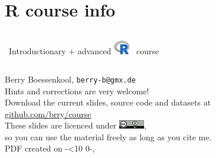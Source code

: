 \documentclass[xcolor=table,       handout,    xcolor=dvipsnames]{beamer}\usepackage[]{graphicx}\usepackage[]{color}
\newcommand{\leadingzero}[1]{\ifnum #1<10 0\the#1\else\the#1\fi}
\begin{document}






\section{R course info}



{
\begin{frame}
\begin{center}
    \begin{columns}
    \column{22.0em}
    \begin{block}{}{\Large ~Introductionary + advanced \includegraphics[width=0.7cm]{externalfig/Rlogo.png} ~course}
    \end{block}
    \end{columns}
\vspace{1em}
Berry Boessenkool, \texttt{berry-b@gmx.de}\\
Hints and corrections are very welcome!\\[1em]
Download the current slides, source code and datasets at\\
\Large
\href{https://github.com/brry/course}{github.com/brry/course}\\[1em]
\normalsize
These slides are licenced under 
\href{https://creativecommons.org/licenses/by/4.0}{\includegraphics[width=3em]{externalfig/ccby.png}},\\
so you can use the material freely as long as you cite me.\\[2em]
\scriptsize
PDF created on \the\year-\leadingzero{\month}-\the\day, \currenttime\ \\[1em]
\end{center}
\end{frame}
}
\end{document}
